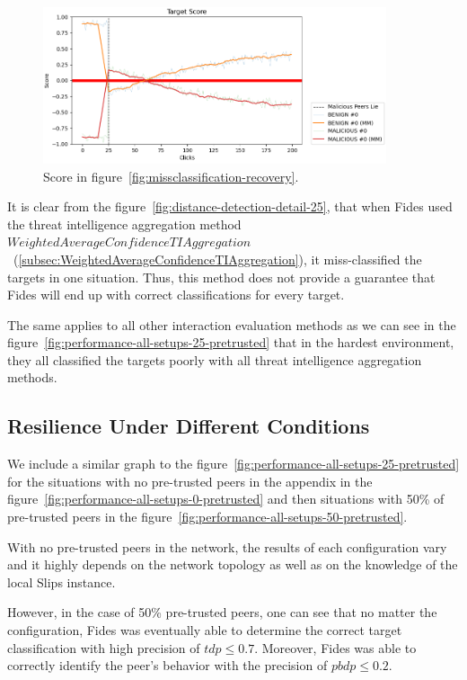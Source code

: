 \begin{figure}[ht]
    \centering
    \includegraphics[width=0.9\textwidth]{assets/misclassification_score.png}
    \caption{Score in figure~\ref{fig:missclassification-recovery}.}
    \label{fig:missclassification-score-only}
\end{figure}

It is clear from the figure~\ref{fig:distance-detection-detail-25}, that when Fides used the threat intelligence aggregation method  $WeightedAverageConfidenceTIAggregation$~(\ref{subsec:WeightedAverageConfidenceTIAggregation}), it miss-classified the targets in one situation.
Thus, this method does not provide a guarantee that Fides will end up with correct classifications for every target.

The same applies to all other interaction evaluation methods as we can see in the figure~\ref{fig:performance-all-setups-25-pretrusted} that in the hardest environment, they all classified the targets poorly with all threat intelligence aggregation methods.

\subsection{Resilience Under Different Conditions}
\label{subsec:resilience-under-different-conditions}

We include a similar graph to the figure~\ref{fig:performance-all-setups-25-pretrusted} for the situations with no pre-trusted peers in the appendix in the figure~\ref{fig:performance-all-setups-0-pretrusted} and then situations with 50\% of pre-trusted peers in the figure~\ref{fig:performance-all-setups-50-pretrusted}.

With no pre-trusted peers in the network, the results of each configuration vary and it highly depends on the network topology as well as on the knowledge of the local Slips instance.

However, in the case of 50\% pre-trusted peers, one can see that no matter the configuration, Fides was eventually able to determine the correct target classification with high precision of $tdp \leq 0.7$. Moreover, Fides was able to correctly identify the peer's behavior with the precision of $pbdp \leq 0.2$.